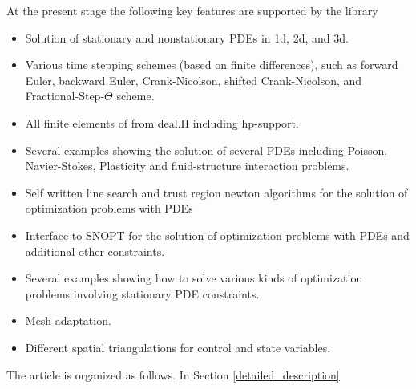 \documentclass[prodmode,acmtoms]{acmsmall}
\numberwithin{equation}{section}
\begin{document}
At the present stage the following key features are supported by the library
\begin{itemize}
\item Solution of stationary and nonstationary PDEs in 1d, 2d, and 3d.
\item Various time stepping schemes (based on finite differences), 
  such as forward Euler, backward Euler,
  Crank-Nicolson, shifted Crank-Nicolson, and Fractional-Step-$\Theta$ scheme.
\item All finite elements of from deal.II including hp-support.
\item Several examples showing the solution of several PDEs including
   Poisson, Navier-Stokes, Plasticity and fluid-structure interaction problems. 
\item Self written line search and trust region newton algorithms for the 
   solution of optimization problems with PDEs \cite{NoWr00}
\item Interface to SNOPT for the solution of optimization problems with PDEs and
  additional other constraints.
\item Several examples showing how to solve various kinds of optimization problems
  involving stationary PDE constraints.
\item Mesh adaptation.
\item Different spatial triangulations for control and state variables.
\end{itemize}

The article is organized as follows. In Section
\ref{detailed_description} 
 
%
%
%
\end{document}
